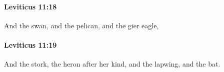 		\paragraph{Leviticus 11:18} %
			\label{LEVITICUS-11-18}

			And the swan, and the pelican, and the gier eagle,


		\paragraph{Leviticus 11:19} %
			\label{LEVITICUS-11-19}

			And the stork, the heron after her kind, and the lapwing, and the bat.



